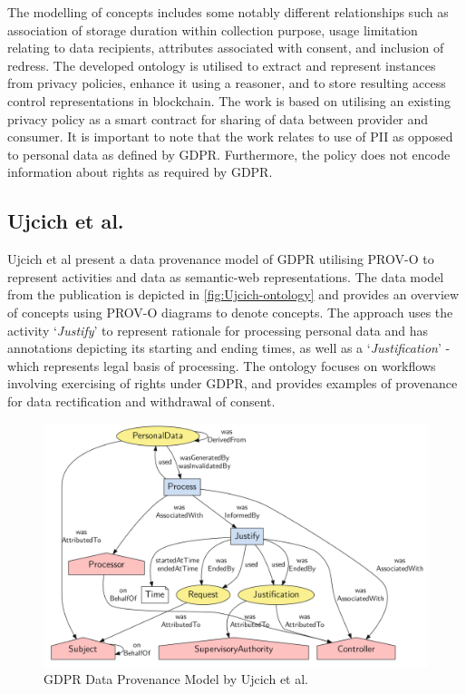 The modelling of concepts includes some notably different relationships such as association of storage duration within collection purpose, usage limitation relating to data recipients, attributes associated with consent, and inclusion of redress. The developed ontology is utilised to extract and represent instances from privacy policies, enhance it using a reasoner, and to store resulting access control representations in blockchain. The work is based on utilising an existing privacy policy as a smart contract for sharing of data between provider and consumer.
It is important to note that the work relates to use of PII as opposed to personal data as defined by GDPR. Furthermore, the policy does not encode information about rights as required by GDPR.

\subsection*{Ujcich et al.}\label{sec:sota:gdpr-semweb:ujcich}
Ujcich et al \cite{belhajjame_provenance_2018} present a data provenance model of GDPR utilising PROV-O \cite{lebo_prov-o_2013} to represent activities and data as semantic-web representations.
The data model from the publication is depicted in \autoref{fig:Ujcich-ontology} and provides an overview of concepts using PROV-O \cite{lebo_prov-o_2013} diagrams to denote concepts.
The approach uses the activity `\textit{Justify}' to represent rationale for processing personal data and has annotations depicting its starting and ending times, as well as a `\textit{Justification}' - which represents legal basis of processing. The ontology focuses on workflows involving exercising of rights under GDPR, and provides examples of provenance for data rectification and withdrawal of consent.
\begin{figure}[htbp]
    \centering
    \includegraphics[width=\linewidth]{img/Ujcich_ontology.png}
    \caption{GDPR Data Provenance Model by Ujcich et al. \cite{belhajjame_provenance_2018}}
    \label{fig:Ujcich-ontology}
\end{figure}

